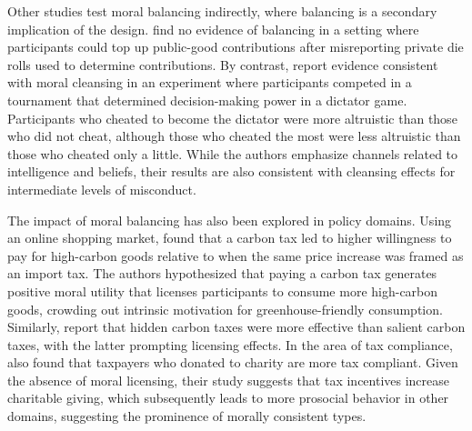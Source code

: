 \documentclass{article}
\begin{document}
\par
Other studies test moral balancing indirectly, where balancing is a secondary implication of the design. \textcite{Parsons2020} find no evidence of balancing in a setting where participants could top up public-good contributions after misreporting private die rolls used to determine contributions. By contrast, \textcite{Johnson2023} report evidence consistent with moral cleansing in an experiment where participants competed in a tournament that determined decision-making power in a dictator game. Participants who cheated to become the dictator were more altruistic than those who did not cheat, although those who cheated the most were less altruistic than those who cheated only a little. While the authors emphasize channels related to intelligence and beliefs, their results are also consistent with cleansing effects for intermediate levels of misconduct.
\par
The impact of moral balancing has also been explored in policy domains. Using an online shopping market, \textcite{Pizzo2024} found that a carbon tax led to higher willingness to pay for high-carbon goods relative to when the same price increase was framed as an import tax. The authors hypothesized that paying a carbon tax generates positive moral utility that licenses participants to consume more high-carbon goods, crowding out intrinsic motivation for greenhouse-friendly consumption. Similarly, \textcite{Hartmann2023} report that hidden carbon taxes were more effective than salient carbon taxes, with the latter prompting licensing effects. In the area of tax compliance, \textcite{Bobek2024} also found that taxpayers who donated to charity are more tax compliant. Given the absence of moral licensing, their study suggests that tax incentives increase charitable giving, which subsequently leads to more prosocial behavior in other domains, suggesting the prominence of morally consistent types.
\par
\end{document}
